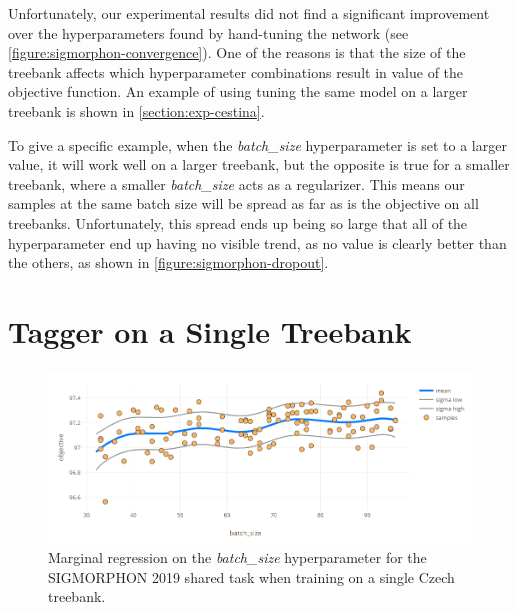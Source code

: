 Unfortunately, our experimental results did not find a significant improvement over the hyperparameters found by hand-tuning the network (see \autoref{figure:sigmorphon-convergence}). One of the reasons is that the size of the treebank affects which hyperparameter combinations result in value of the objective function. An example of using tuning the same model on a larger treebank is shown in \autoref{section:exp-cestina}.

To give a specific example, when the \emph{batch\_size} hyperparameter is set to a larger value, it will work well on a larger treebank, but the opposite is true for a smaller treebank, where a smaller \emph{batch\_size} acts as a regularizer. This means our samples at the same batch size will be spread as far as is the objective on all treebanks. Unfortunately, this spread ends up being so large that all of the hyperparameter end up having no visible trend, as no value is clearly better than the others, as shown in \autoref{figure:sigmorphon-dropout}.


\section{Tagger on a Single Treebank}
\label{section:exp-cestina}


\begin{figure}
	\begin{center}
		\includegraphics[width=1.0\textwidth]{images/czech-batch-size.png}
		\caption{Marginal regression on the \emph{batch\_size} hyperparameter for the SIGMORPHON 2019 shared task when training on a single Czech treebank.}
		\label{figure:czech-batch-size}
	\end{center}
\end{figure}


